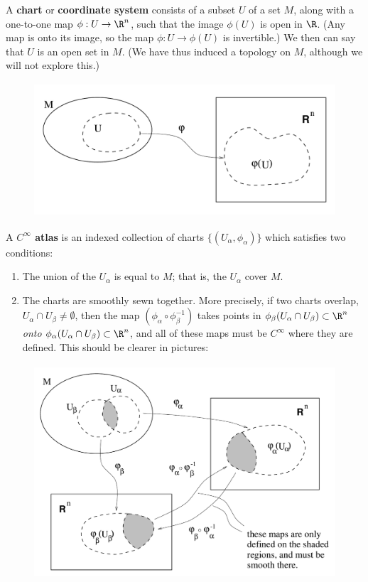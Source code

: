 \documentclass[12pt]{article}
\begin{document}
A {\bf chart} or {\bf coordinate system} consists of a subset $U$ of a 
set $M$, along with a one-to-one map $\phi:U\rightarrow\R^n$, such that the 
image $\phi(U)$ is open in $\R$.  (Any map is onto its image, so the
map $\phi:U\rightarrow \phi(U)$ is invertible.)  We then can say that
$U$ is an open set in $M$.  (We have thus induced a topology on $M$,
although we will not explore this.)

\begin{figure}[h]
  \centerline{
  \includegraphics[height=5cm]{pdf/two10}}
\end{figure}

\noindent A {\bf $C^\infty$ atlas} is an indexed collection of charts 
$\{(U_\alpha,\phi_\alpha)\}$ which satisfies two conditions:
\begin{enumerate}
  \item The union of the $U_\alpha$ is equal to $M$; that is, the
   $U_\alpha$ cover $M$.
  \item The charts are smoothly sewn together.  More precisely, if
   two charts overlap, $U_\alpha\cap U_\beta\neq\emptyset$, then the
   map $(\phi_\alpha\circ\phi_\beta^{-1})$ takes points in 
   $\phi_\beta(U_\alpha\cap U_\beta)\subset\R^n$ {\it onto}
   $\phi_\alpha(U_\alpha\cap U_\beta)\subset\R^n$, and all of these
   maps must be $C^\infty$ where they are defined.  This should be clearer 
   in pictures:
\end{enumerate}

\begin{figure}[h]
  \centerline{
  \includegraphics[height=8cm]{pdf/two11}}
\end{figure}
\end{document}
